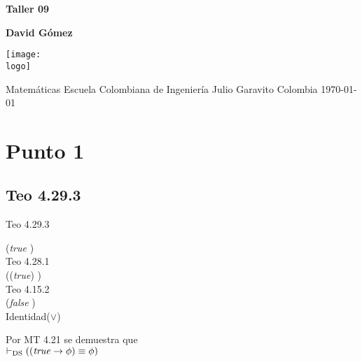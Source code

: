 \documentclass{article}
\newcommand{\logo}{C:/Users/usuario/Documents/U/logo-eci.jpg}
\newcommand{\titlename}{Taller 09}%
\renewcommand{\author}{David Gómez}%
\begin{document}
\begin{titlepage}
    \begin{center}
        \vspace*{1cm}

        \textbf{\Huge{\titlename}}

        \vspace{1.5cm}

        \textbf{\large{\author}
}
        \vspace{4cm}

        \texttt{[image: \\logo]}

        \vspace{4cm}

        Matemáticas\linebreak
        Escuela Colombiana de Ingeniería Julio Garavito\linebreak
        Colombia\linebreak
        \today

    \end{center}
\end{titlepage}
\clearpage
\tableofcontents
\clearpage

\section{Punto 1}

\subsection{Teo 4.29.3}

\begin{logicenv}{Teo 4.29.3}
    \begin{derivation}
            (\textrm{\textit{true}} \to \phi)\\
        Teo 4.28.1\\
            ((\neg \textrm{\textit{true}}) \lor \phi)\\
        Teo 4.15.2\\
            (\textit{false} \lor \phi)\\
        Identidad($\lor$)\\
            \phi
    \end{derivation}
    Por MT 4.21 se demuestra que\\
    $\vdash_{\text{DS}} ((\textrm{\textit{true}} \to \phi) \equiv \phi)$
\end{logicenv}
\end{document}
